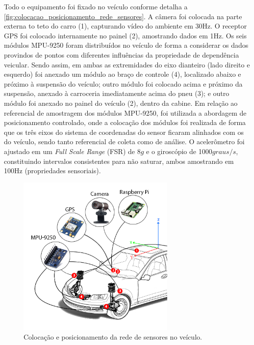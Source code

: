 Todo o equipamento foi fixado no veículo conforme detalha a \autoref{fig:colocacao_posicionamento_rede_sensores}. A câmera foi colocada na parte externa to teto do carro (1), capturando vídeo do ambiente em 30Hz. O receptor GPS foi colocado internamente no painel (2), amostrando dados em 1Hz. Os seis módulos MPU-9250 foram distribuídos no veículo de forma a considerar os dados provindos de pontos com diferentes influências da propriedade de dependência veicular. Sendo assim, em ambas as extremidades do eixo dianteiro (lado direito e esquerdo) foi anexado um módulo ao braço de controle (4), localizado abaixo e próximo à suspensão do veículo; outro módulo foi colocado acima e próximo da suspensão, anexado à carroceria imediatamente acima do pneu (3); e outro módulo foi anexado no painel do veículo (2), dentro da cabine. Em relação ao referencial de amostragem dos módulos MPU-9250, foi utilizada a abordagem de posicionamento controlado, onde a colocação dos módulos foi realizada de forma que os três eixos do sistema de coordenadas do sensor ficaram alinhados com os do veículo, sendo tanto referencial de coleta como de análise. O acelerômetro foi ajustado em um \textit{Full Scale Range} (FSR) de 8$g$ e o giroscópio de 1000$graus/s$, constituindo intervalos consistentes para não saturar, ambos amostrando em 100Hz (propriedades sensoriais).

\begin{figure}[h!]
  \centering
  \caption{Colocação e posicionamento da rede de sensores no veículo.}
   \label{fig:colocacao_posicionamento_rede_sensores}
   \includegraphics[width=0.69\textwidth]{figuras/fig_22.png}
\end{figure}

